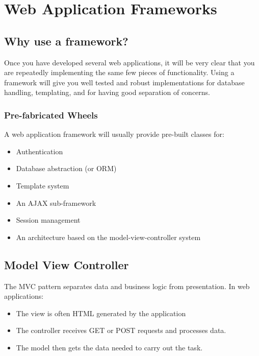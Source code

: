 \section{Web Application Frameworks}\label{sec:web_application_frameworks}

\subsection{Why use a framework?}\label{sub:why_use_a_framework_}

Once you have developed several web applications, it will be very clear that you are repeatedly implementing the same few pieces of functionality.
Using a framework will give you well tested and robust implementations for database handling, templating, and for having good separation of concerns.

\subsubsection{Pre-fabricated Wheels}\label{ssub:pre_fabricated_wheels}

A web application framework will usually provide pre-built classes for:
\begin{itemize}
    \item Authentication
    \item Database abstraction (or ORM)
    \item Template system
    \item An AJAX sub-framework
    \item Session management
    \item An architecture based on the model-view-controller system
\end{itemize}

\subsection{Model View Controller}\label{sub:model_view_controller}

The MVC pattern separates data and business logic from presentation.
In web applications:
\begin{itemize}
    \item The view is often HTML generated by the application
    \item The controller receives GET or POST requests and processes data.
    \item The model then gets the data needed to carry out the task.
\end{itemize}

